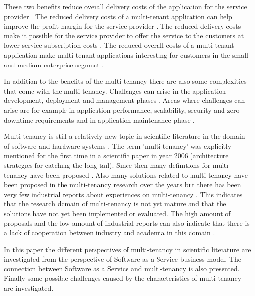 \documentclass[conference]{sasmoota2017}
\begin{document}
These two benefits reduce overall delivery costs of the application for the service provider \cite{Bezemer:2010:MaintenanceDream}. The reduced delivery costs of a multi-tenant application can help improve the profit margin for the service provider \cite{Guo:2007:FrameworkForNative}. The reduced delivery costs make it possible for the service provider to offer the service to the customers at lower service subscription costs \cite{Guo:2007:FrameworkForNative}. The reduced overall costs of a multi-tenant application make multi-tenant applications interesting for customers in the small and medium enterprise segment \cite{Bezemer:2010:MaintenanceDream}.

In addition to the benefits of the multi-tenancy there are also some complexities that come with the multi-tenancy. Challenges can arise in the application development, deployment and management phases \cite{Guo:2007:FrameworkForNative}. Areas where challenges can arise are for example in application performance, scalability, security and zero-downtime requirements and in application maintenance phase \cite{Bezemer:2010:MaintenanceDream}. 

Multi-tenancy is still a relatively new topic in scientific literature in the domain of software and hardware systems \cite{Kabbedijk2015:Defining}. The term 'multi-tenancy' was explicitly mentioned for the first time in a scientific paper in year 2006 \cite{Kabbedijk2015:Defining} (architecture strategies for catching the long tail). Since then many definitions for multi-tenancy have been proposed \cite{Kabbedijk2015:Defining}. Also many solutions related to multi-tenancy have been proposed in the multi-tenancy research over the years but there has been very few industrial reports about experiences on multi-tenancy \cite{Kabbedijk2015:Defining}. This indicates that the research domain of multi-tenancy is not yet mature and that the solutions have not yet been implemented or evaluated. The high amount of proposals and the low amount of industrial reports can also indicate that there is a lack of cooperation between industry and academia in this domain \cite{Kabbedijk2015:Defining}.

In this paper the different perspectives of multi-tenancy in scientific literature are investigated from the perspective of Software as a Service business model. The connection between Software as a Service and multi-tenancy is also presented. Finally some possible challenges caused by the characteristics of multi-tenancy are investigated.
\end{document}
